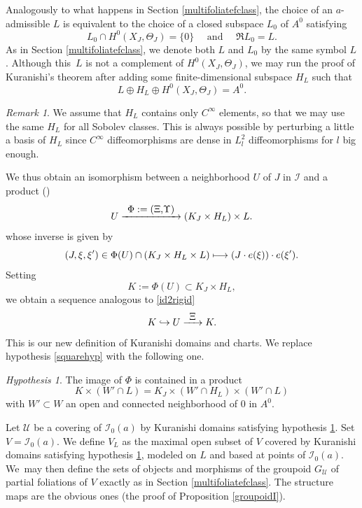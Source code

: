 \documentclass[10pt]{amsart}
\let\mathcal\mathscr
\def\mto{\mathchoice{\longmapsto}{\mapsto}{\mapsto}{\mapsto}}
\def\hto{\mathrel{\lhook\joinrel\to}}
\def\To#1{\mathchoice{\xrightarrow{\textstyle\kern4pt#1\kern3pt}}{\stackrel{#1}{\longrightarrow}}{}{}}
\theoremstyle{plain}
\theoremstyle{definition}
\theoremstyle{remark}
\newtheorem{remark}[theorem]{Remark}
\newtheorem{hypothesis}[theorem]{Hypothesis}
\numberwithin{equation}{section}
\newcommand{\cI}{\mathcal{I}}
\begin{document}
Analogously to what happens in Section \ref{multifoliatefclass}, the choice of an $a$-admissible $L$ is equivalent to the choice of a closed subspace $L_0$ of $A^0$ satisfying
\begin{equation}
\label{L0bis}
L_0\cap H^0(X_J,\Theta_J)=\{0\}\quad\text{ and }\quad\Re L_0=L.
\end{equation}
As in Section \ref{multifoliatefclass}, we denote both $L$ and $L_0$ by the same symbol $L$. Although this~$L$ is not a complement of $H^0(X_J,\Theta_J)$, we may run the proof of Kuranishi's theorem after adding some finite-dimensional subspace $H_L$ such that
\begin{equation}
\label{L+H}
L\oplus H_L\oplus H^0(X_J,\Theta_J)=A^0.
\end{equation}
\begin{remark}
\label{Cinfini}
We assume that $H_{L}$ contains only $C^\infty$ elements, so that we may use the same $H_L$ for all Sobolev classes. This is always possible by perturbing a little a basis of $H_L$ since $C^\infty$ diffeomorphisms are dense in $L^2_l$ diffeomorphisms for $l$ big enough.
\end{remark}
We thus obtain an isomorphism between a neighborhood $U$ of $J$ in $\cI$ and a product (\cf \cite[Th.\,7.2]{circle})\vspace*{-3pt}
\begin{equation}
\label{fatiso}
U\To{\Phi:=(\Xi\text{,}\Upsilon)}(K_J\times H_L)\times L.
\end{equation}
whose inverse is given by
\begin{equation}
\label{fatisoinverse}
(J,\xi,\xi')\in \Phi(U)\cap (K_J\times H_L\times L)\mto (J\cdot e(\xi))\cdot e(\xi').
\end{equation}
Setting
\begin{equation}
\label{K}
K:=\Phi(U)\subset K_J\times H_L,
\end{equation}
we obtain a sequence analogous to \eqref{id2rigid}
\begin{equation}
\label{id2bis}
K\hto U\To{\Xi}K.
\end{equation}
This is our new definition of Kuranishi domains and charts. We replace hypothesis \eqref{squarehyp} with the following one.
\begin{hypothesis}
\label{squarehyp2}
The image of $\Phi$ is contained in a product
\[
K\times (W'\cap L)=K_J\times (W'\cap H_L)\times (W'\cap L)
\]
with $W'\subset W$ an open and connected neighborhood of $0$ in $A^0$.
\end{hypothesis}
Let $\mathcal U$ be a covering of $\cI_0(a)$ by Kuranishi domains satisfying hypothesis \ref{squarehyp2}.
Set $V=\cI_0(a)$.
We define $V_L$ as the maximal open subset of $V$ covered by Kuranishi domains satisfying hypothesis \ref{squarehyp2}, modeled on $L$ and based at points of $\cI_0(a)$. We~may then define the sets of objects and morphisms of the groupoid $G_{\mathcal U}$ of partial foliations of $V$ exactly as in Section \ref{multifoliatefclass}. The structure maps are the obvious ones (\cf the proof of Proposition \ref{groupoidI}).
\end{document}

